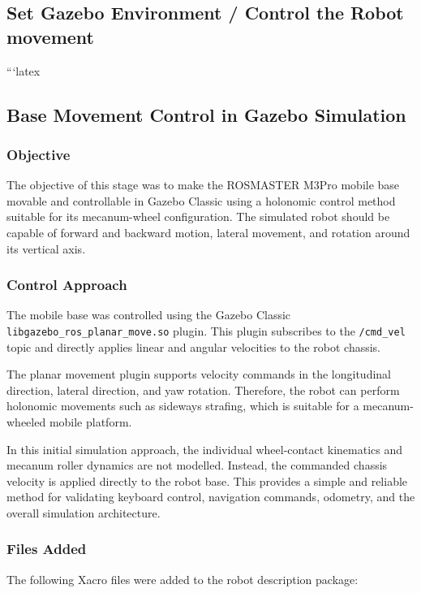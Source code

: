 \documentclass{article}
\begin{document}
\subsection{Set Gazebo Environment / Control the Robot movement}

```latex
\subsection{Base Movement Control in Gazebo Simulation}

\subsubsection{Objective}

The objective of this stage was to make the ROSMASTER M3Pro mobile base movable and controllable in Gazebo Classic using a holonomic control method suitable for its mecanum-wheel configuration. The simulated robot should be capable of forward and backward motion, lateral movement, and rotation around its vertical axis.

\subsubsection{Control Approach}

The mobile base was controlled using the Gazebo Classic \texttt{libgazebo\_ros\_planar\_move.so} plugin. This plugin subscribes to the \texttt{/cmd\_vel} topic and directly applies linear and angular velocities to the robot chassis.

The planar movement plugin supports velocity commands in the longitudinal direction, lateral direction, and yaw rotation. Therefore, the robot can perform holonomic movements such as sideways strafing, which is suitable for a mecanum-wheeled mobile platform.

In this initial simulation approach, the individual wheel-contact kinematics and mecanum roller dynamics are not modelled. Instead, the commanded chassis velocity is applied directly to the robot base. This provides a simple and reliable method for validating keyboard control, navigation commands, odometry, and the overall simulation architecture.

\subsubsection{Files Added}

The following Xacro files were added to the robot description package:
\end{document}
